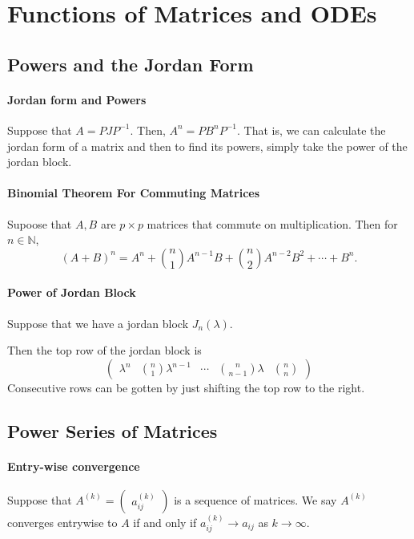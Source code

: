 
\section{Functions of Matrices and ODEs}

\subsection{Powers and the Jordan Form}

\paragraph{Jordan form and Powers}
Suppose that \( A = P J P^{-1} \). Then, \( A^n = P B^n P^{-1} \).
That is, we can calculate the jordan form of a matrix and then
to find its powers, simply take the power of the jordan block.

\paragraph{Binomial Theorem For Commuting Matrices}
Supoose that \( A, B \) are \( p\times p \) matrices
that commute on multiplication. Then for \( n \in \mathbb{N} \),
\[
    {(A + B)}^n = A^n
    + {n \choose 1} A^{n - 1} B
    + {n \choose 2 } A^{n - 2}B^2
    + \cdots
    + B^{n}
.\]

\paragraph{Power of Jordan Block}
Suppose that we have a jordan block \( J_n(\lambda) \).

Then the top row of the jordan block is \[
\begin{pmatrix}
    \lambda^n & {n \choose 1} \lambda^{n - 1} & \cdots & {n \choose n - 1} \lambda & {n \choose n}
\end{pmatrix}
\]
Consecutive rows can be gotten by just shifting the top row to the right.

\subsection{Power Series of Matrices}

\paragraph{Entry-wise convergence}
Suppose that \( A^{(k)} = \begin{pmatrix} a_{ij}^{(k)} \end{pmatrix} \)
is a sequence of matrices. We say \( A^{(k)} \) converges
entrywise to \( A \) if and only if \( a_{ij}^{(k)} \to a_{ij} \)
as \( k \to \infty \).


